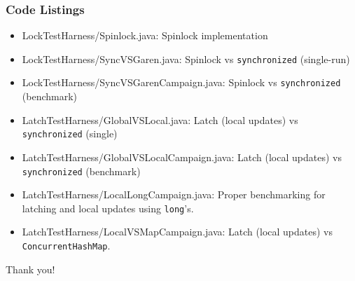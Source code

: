\documentclass[xcolor={dvipsnames,svgnames},aspectratio=169]{beamer}
\begin{document}
\begin{frame}[fragile]
  \frametitle{Code Listings}

  \begin{itemize}
  \item[\faCode]<1-> LockTestHarness/Spinlock.java: Spinlock implementation
  \item[\faCode]<1-> LockTestHarness/SyncVSGaren.java: Spinlock vs
    \texttt{synchronized} (single-run)
  \item[\faCode]<1-> LockTestHarness/SyncVSGarenCampaign.java: Spinlock vs
    \texttt{synchronized} (benchmark)
  \item[\faCode]<1-> LatchTestHarness/GlobalVSLocal.java: Latch (local
    updates) vs
    \texttt{synchronized} (single)
  \item[\faCode]<1-> LatchTestHarness/GlobalVSLocalCampaign.java: Latch (local
    updates) vs
    \texttt{synchronized} (benchmark)
  \item[\faCode]<1-> LatchTestHarness/LocalLongCampaign.java: Proper
    benchmarking for latching and local updates using \texttt{long}'s.
  \item[\faCode]<1-> LatchTestHarness/LocalVSMapCampaign.java: Latch
    (local updates) vs \texttt{ConcurrentHashMap}.
  \end{itemize}

\end{frame}

\begin{frame}{}
  \centering \huge
  Thank you!
\end{frame}
\end{document}

